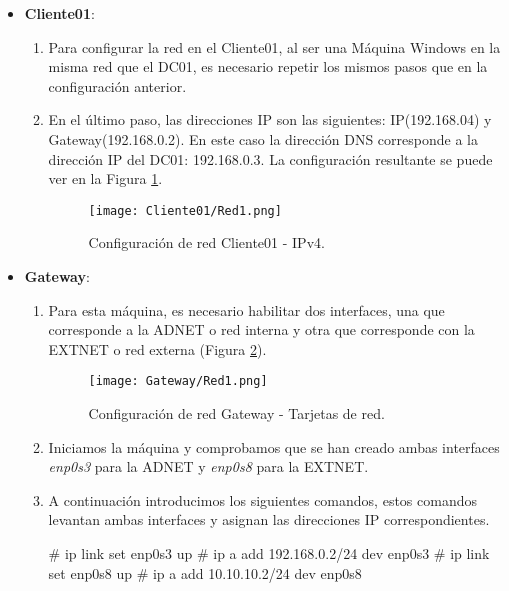 \begin{itemize}
\item \textbf{Cliente01}:
\begin{enumerate}
\item Para configurar la red en el Cliente01, al ser una Máquina Windows en la misma red que el DC01, es necesario repetir los mismos pasos que en la configuración anterior.
\item En el último paso, las direcciones IP son las siguientes: IP(192.168.04) y Gateway(192.168.0.2). En este caso la dirección DNS corresponde a la dirección IP del DC01: 192.168.0.3. La configuración resultante se puede ver en la Figura \ref{Cliente01-Red1}.

\begin{figure}[H] %
\begin{center}
\texttt{[image: Cliente01/Red1.png]}
\end{center}
\caption{Configuración de red Cliente01 - IPv4.}
\label{Cliente01-Red1}
\end{figure}
\end{enumerate}

\item \textbf{Gateway}:

\begin{enumerate}
\item Para esta máquina, es necesario habilitar dos interfaces, una que corresponde a la ADNET o red interna y otra que corresponde con la EXTNET o red externa (Figura \ref{Gateway-Red1}).
\begin{figure}[H] %
\begin{center}
\texttt{[image: Gateway/Red1.png]}
\end{center}
\caption{Configuración de red Gateway - Tarjetas de red.}
\label{Gateway-Red1}
\end{figure}

\item Iniciamos la máquina y comprobamos que se han creado ambas interfaces {\it enp0s3} para la ADNET y {\it enp0s8} para la EXTNET. 

\item A continuación introducimos los siguientes comandos, estos comandos levantan ambas interfaces y asignan las direcciones IP correspondientes. 
\begin{listing}[style=consola, numbers=none]
# ip link set enp0s3 up
# ip a add 192.168.0.2/24 dev enp0s3
# ip link set enp0s8 up
# ip a add 10.10.10.2/24 dev enp0s8
\end{listing}


\end{enumerate}
\end{itemize}
